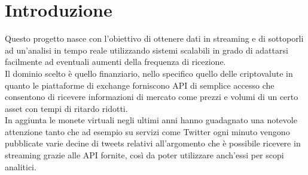 \section{Introduzione}

Questo progetto nasce con l'obiettivo di ottenere dati in streaming e di sottoporli
ad un'analisi in tempo reale utilizzando sistemi scalabili in grado di adattarsi facilmente ad
eventuali aumenti della frequenza di ricezione.\\
Il dominio scelto è quello finanziario, nello specifico quello delle criptovalute in
quanto le piattaforme di exchange forniscono API di semplice accesso che consentono di ricevere
informazioni di mercato come prezzi e volumi di un certo asset con tempi di ritardo ridotti.\\
In aggiunta le monete virtuali negli ultimi anni hanno guadagnato una notevole attenzione
tanto che ad esempio su servizi come Twitter ogni minuto vengono pubblicate varie decine di tweets
relativi all'argomento che è possibile ricevere in streaming grazie alle API fornite, così da
poter utilizzare anch'essi per scopi analitici.